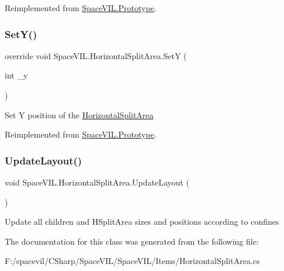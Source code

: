 Reimplemented from \mbox{\hyperlink{class_space_v_i_l_1_1_prototype_ae96644a6ace490afb376fb542161e541}{Space\+V\+I\+L.\+Prototype}}.

\mbox{\label{class_space_v_i_l_1_1_horizontal_split_area_a49f19dd9999b4ab40def3b69b2682973}} 
\subsubsection{\texorpdfstring{Set\+Y()}{SetY()}}
{\footnotesize\ttfamily override void Space\+V\+I\+L.\+Horizontal\+Split\+Area.\+SetY (\begin{DoxyParamCaption}\item[{int}]{\+\_\+y }\end{DoxyParamCaption})\hspace{0.3cm}{\ttfamily [virtual]}}



Set Y position of the \mbox{\hyperlink{class_space_v_i_l_1_1_horizontal_split_area}{Horizontal\+Split\+Area}} 



Reimplemented from \mbox{\hyperlink{class_space_v_i_l_1_1_prototype}{Space\+V\+I\+L.\+Prototype}}.

\mbox{\label{class_space_v_i_l_1_1_horizontal_split_area_a17787a6998374e9fea24a7a7a466be42}} 
\subsubsection{\texorpdfstring{Update\+Layout()}{UpdateLayout()}}
{\footnotesize\ttfamily void Space\+V\+I\+L.\+Horizontal\+Split\+Area.\+Update\+Layout (\begin{DoxyParamCaption}{ }\end{DoxyParamCaption})}



Update all children and H\+Split\+Area sizes and positions according to confines 



The documentation for this class was generated from the following file\+:\begin{DoxyCompactItemize}
\item 
F\+:/spacevil/\+C\+Sharp/\+Space\+V\+I\+L/\+Space\+V\+I\+L/\+Items/Horizontal\+Split\+Area.\+cs\end{DoxyCompactItemize}
